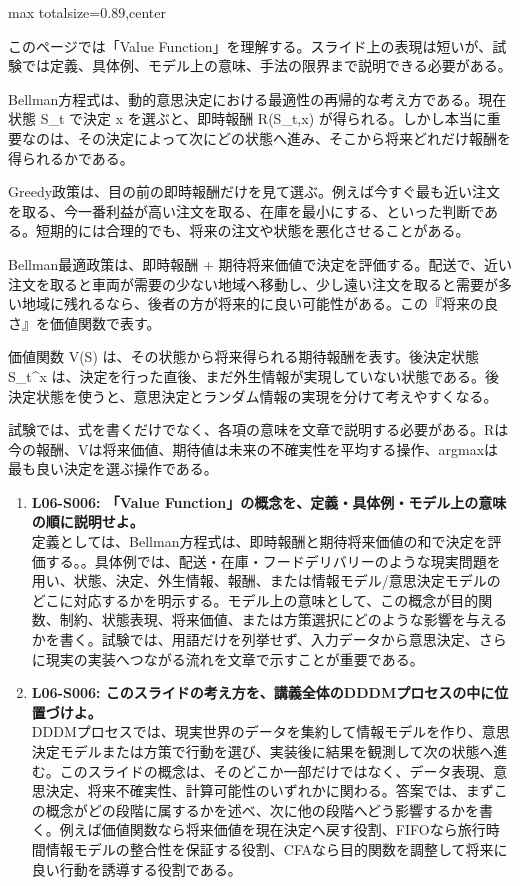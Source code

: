 \begin{minipage}[t]{0.58\textwidth}
\begin{adjustbox}{max totalsize={\textwidth}{0.89\textheight},center}
\begin{minipage}{\textwidth}\scriptsize
{}このページでは「Value Function」を理解する。スライド上の表現は短いが、試験では定義、具体例、モデル上の意味、手法の限界まで説明できる必要がある。\par
Bellman方程式は、動的意思決定における最適性の再帰的な考え方である。現在状態 S\_t で決定 x を選ぶと、即時報酬 R(S\_t,x) が得られる。しかし本当に重要なのは、その決定によって次にどの状態へ進み、そこから将来どれだけ報酬を得られるかである。\par
Greedy政策は、目の前の即時報酬だけを見て選ぶ。例えば今すぐ最も近い注文を取る、今一番利益が高い注文を取る、在庫を最小にする、といった判断である。短期的には合理的でも、将来の注文や状態を悪化させることがある。\par
Bellman最適政策は、即時報酬 + 期待将来価値で決定を評価する。配送で、近い注文を取ると車両が需要の少ない地域へ移動し、少し遠い注文を取ると需要が多い地域に残れるなら、後者の方が将来的に良い可能性がある。この『将来の良さ』を価値関数で表す。\par
価値関数 V(S) は、その状態から将来得られる期待報酬を表す。後決定状態 S\_t\textasciicircum{}x は、決定を行った直後、まだ外生情報が実現していない状態である。後決定状態を使うと、意思決定とランダム情報の実現を分けて考えやすくなる。\par
試験では、式を書くだけでなく、各項の意味を文章で説明する必要がある。Rは今の報酬、Vは将来価値、期待値は未来の不確実性を平均する操作、argmaxは最も良い決定を選ぶ操作である。\par{}\begin{enumerate}\item \textbf{L06-S006: 「Value Function」の概念を、定義・具体例・モデル上の意味の順に説明せよ。}\\定義としては、Bellman方程式は、即時報酬と期待将来価値の和で決定を評価する。。具体例では、配送・在庫・フードデリバリーのような現実問題を用い、状態、決定、外生情報、報酬、または情報モデル/意思決定モデルのどこに対応するかを明示する。モデル上の意味として、この概念が目的関数、制約、状態表現、将来価値、または方策選択にどのような影響を与えるかを書く。試験では、用語だけを列挙せず、入力データから意思決定、さらに現実の実装へつながる流れを文章で示すことが重要である。\item \textbf{L06-S006: このスライドの考え方を、講義全体のDDDMプロセスの中に位置づけよ。}\\DDDMプロセスでは、現実世界のデータを集約して情報モデルを作り、意思決定モデルまたは方策で行動を選び、実装後に結果を観測して次の状態へ進む。このスライドの概念は、そのどこか一部だけではなく、データ表現、意思決定、将来不確実性、計算可能性のいずれかに関わる。答案では、まずこの概念がどの段階に属するかを述べ、次に他の段階へどう影響するかを書く。例えば価値関数なら将来価値を現在決定へ戻す役割、FIFOなら旅行時間情報モデルの整合性を保証する役割、CFAなら目的関数を調整して将来に良い行動を誘導する役割である。\end{enumerate}

\end{minipage}
\end{adjustbox}
\end{minipage}
